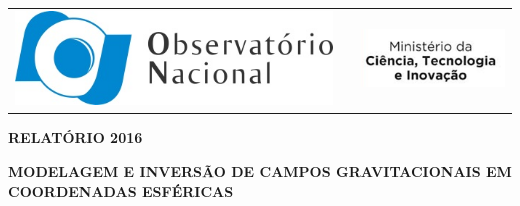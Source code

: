 \documentclass[12pt,a4paper]{article}
\begin{document}
\begin{tabular}{lcr}
    \includegraphics{img/logo-on.jpg}
    & \hspace{5cm} &
    \includegraphics{img/logo-mcti.png}
\end{tabular}

\vspace{0.5cm}

\begin{center}
    \textbf{\LARGE RELATÓRIO 2016}

    \vspace{1cm}

    \textbf{MODELAGEM E INVERSÃO DE CAMPOS GRAVITACIONAIS EM COORDENADAS
            ESFÉRICAS}
\end{center}

\vspace{1.5cm}
\end{document}

